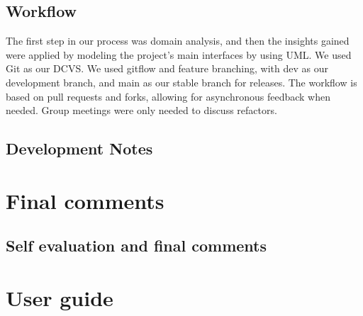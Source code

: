 \documentclass[a4paper,12pt]{report}
\begin{document}




\section{Workflow}
The first step in our process was domain analysis, and then the insights gained were applied by modeling 
the project's main interfaces by using UML.
We used Git as our DCVS. We used gitflow and feature branching, with dev as our development branch,
and main as our stable branch for releases. The workflow is based on pull requests and forks, allowing for asynchronous feedback when needed.
Group meetings were only needed to discuss refactors.






\section{Development Notes}





\chapter{Final comments}

\section{Self evaluation and final comments}





\appendix
\chapter{User guide}
\end{document}
